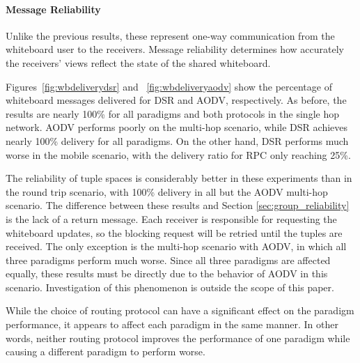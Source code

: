\paragraph{Message Reliability}

Unlike the previous results, these represent one-way communication from the whiteboard user to the receivers. Message reliability determines how accurately the receivers' views reflect the state of the shared whiteboard.

Figures~\ref{fig:wbdeliverydsr} and ~\ref{fig:wbdeliveryaodv} show the percentage of whiteboard messages delivered for DSR and AODV, respectively. As before, the results are nearly 100\% for all paradigms and both protocols in the single hop network. AODV performs poorly on the multi-hop scenario, while DSR achieves nearly 100\% delivery for all paradigms. On the other hand, DSR performs much worse in the mobile scenario, with the delivery ratio for RPC only reaching 25\%.

The reliability of tuple spaces is considerably better in these experiments than in the round trip scenario, with 100\% delivery in all but the AODV multi-hop scenario. The difference between these results and Section \ref{sec:group_reliability} is the lack of a return message. Each receiver is responsible for requesting the whiteboard updates, so the blocking request will be retried until the tuples are received. The only exception is the multi-hop scenario with AODV, in which all three paradigms perform much worse. Since all three paradigms are affected equally, these results must be directly due to the behavior of AODV in this scenario. Investigation of this phenomenon is outside the scope of this paper.

While the choice of routing protocol can have a significant effect on the paradigm performance, it appears to affect each paradigm in the same manner. In other words, neither routing protocol improves the performance of one paradigm while causing a different paradigm to perform worse.

